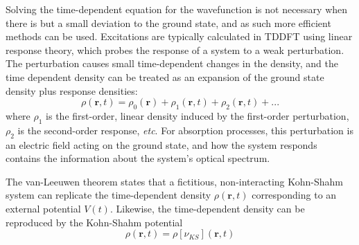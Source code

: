 Solving the time-dependent \schro{} equation for the wavefunction is not necessary when there is but a small deviation to the ground state, and as such more efficient methods can be used. Excitations are typically calculated in \ac{TDDFT} using linear response theory, which probes the response of a system to a weak perturbation. The perturbation causes small time-dependent changes in the density, and the time dependent density can be treated as an expansion of the ground state density plus response densities:
\begin{equation}
    \rho(\bm{r},t)=\rho_{0}(\bm{r})+\rho_{1}(\bm{r},t)+\rho_{2}(\bm{r},t)+...
\end{equation}
where $\rho_1$ is the first-order, linear density induced by the first-order perturbation, $\rho_2$ is the second-order response, \textit{etc}. For absorption processes, this perturbation is an electric field acting on the ground state, and how the system responds contains the information about the system's optical spectrum.\cite{Ullrich2012}

The van-Leeuwen theorem states that a fictitious, non-interacting Kohn-Shahm system can replicate the time-dependent density $\rho(\bm{r}
,t)$ corresponding to an external potential $V(t)$.\cite{Leeuwen1999} Likewise, the time-dependent density can be reproduced by the Kohn-Shahm potential
\begin{equation}
    \rho(\bm{r},t)=\rho[\nu_{KS}](\bm{r},t)
\end{equation}

